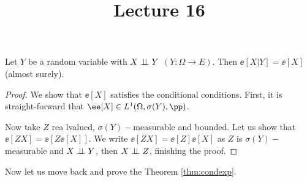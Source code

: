 \documentclass[../main.tex]{subfiles}
\title{Lecture 16}
\begin{document}
    \begin{proposition}
      Let $Y$ be a random variable with $X \perp\!\!\!\!\,\perp Y$ $(Y \colon \Omega \to
      E)$. Then $\ee[X|Y] = \ee[X]$ (almost surely).
    \end{proposition}
    \begin{proof}
      We show that $\ee[X]$ satisfies the conditional conditions. First, it is
      straight-forward that $\ee[X] \in L^1(\Omega, \sigma(Y), \pp)$.

      Now take $Z$ rea lvalued, $\sigma(Y)-$measurable and bounded. Let us
      show that $\ee[ZX] = \ee[Z\ee[X]]$. We write $\ee[ZX] = \ee[Z] \ee[X]$
      as $Z$ is $\sigma(Y)-$measurable and $X \perp\!\!\!\!\,\perp Y$, then $X \perp\!\!\!\!\,\perp Z$,
      finishing the proof.
    \end{proof}

    Now let us move back and prove the Theorem \ref{thm:condexp}.
\end{document}
